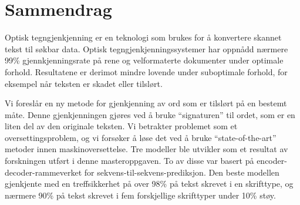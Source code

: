 
\chapter*{Sammendrag}
Optisk tegngjenkjenning er en teknologi som brukes for å konvertere skannet tekst til søkbar data. Optisk tegngjenkjenningssystemer har oppnådd nærmere 99\% gjennkjenningsrate på rene og velformaterte dokumenter under optimale forhold. Resultatene er derimot mindre lovende under suboptimale forhold, for eksempel når teksten er skadet eller tilslørt. \newline

\noindent Vi foreslår en ny metode for gjenkjenning av ord som er tilslørt på en bestemt måte. Denne gjenkjenningen gjøres ved å bruke ``signaturen'' til ordet, som er en liten del av den originale teksten. Vi betrakter problemet som et oversettingsproblem, og vi forsøker å løse det ved å bruke ``state-of-the-art'' metoder innen maskinoversettelse. Tre modeller ble utvikler som et resultat av forskningen utført i denne masteroppgaven. To av disse var basert på encoder-decoder-rammeverket for sekvens-til-sekvens-prediksjon. Den beste modellen gjenkjente med en treffsikkerhet på over 98\% på tekst skrevet i en skrifttype, og nærmere 90\% på tekst skrevet i fem forskjellige skrifttyper under 10\% støy.